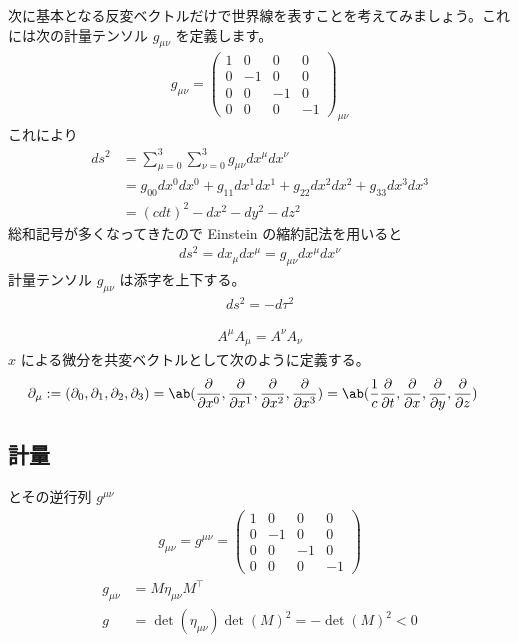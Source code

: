 \documentclass[uplatex,dvipdfmx,a4paper,11pt]{jlreq}
\theoremstyle{definition}
\begin{document}
次に基本となる反変ベクトルだけで世界線を表すことを考えてみましょう。これには次の計量テンソル $g_{\mu\nu}$ を定義します。
\begin{align}
  g_{\mu\nu} = \begin{pmatrix}
                 1 & 0  & 0  & 0  \\
                 0 & -1 & 0  & 0  \\
                 0 & 0  & -1 & 0  \\
                 0 & 0  & 0  & -1
               \end{pmatrix}_{\mu\nu}
\end{align}
これにより
\begin{align}
  ds^2 & = \sum_{\mu = 0}^3\sum_{\nu = 0}^3 g_{\mu\nu}dx^\mu dx^\nu          \\
       & = g_{00}dx^0dx^0 + g_{11}dx^1dx^1 + g_{22}dx^2dx^2 + g_{33}dx^3dx^3 \\
       & = (cdt)^2 - dx^2 - dy^2 - dz^2
\end{align}
総和記号が多くなってきたので Einstein の縮約記法を用いると
\begin{align}
  ds^2 = dx_\mu dx^\mu = g_{\mu\nu}dx^\mu dx^\nu
\end{align}
計量テンソル $g_{\mu\nu}$ は添字を上下する。
\begin{align}
  ds^2 = - d\tau^2
\end{align}

\begin{align}
  A^\mu A_\mu = A^\nu A_\nu
\end{align}
$x$ による微分を共変ベクトルとして次のように定義する。
\begin{align}
  \partial_\mu & := (\partial_0, \partial_1, \partial_2, \partial_3) = \ab(\diffp{}{x^0}, \diffp{}{x^1}, \diffp{}{x^2}, \diffp{}{x^3}) = \ab(\frac{1}{c}\diffp{}{t}, \diffp{}{x}, \diffp{}{y}, \diffp{}{z})
\end{align}

\subsection{計量}
とその逆行列 $g^{\mu\nu}$
\begin{align}
  g_{\mu\nu} = g^{\mu\nu} = \begin{pmatrix}
                              1 & 0 & 0 & 0 \\ 0 & -1 & 0 & 0 \\ 0 & 0 & -1 & 0 \\ 0 & 0 & 0 & -1
                            \end{pmatrix}
\end{align}
\begin{align}
  g_{\mu\nu} & = M\eta_{\mu\nu}M^\top                          \\
  g          & = \det(\eta_{\mu\nu})\det(M)^2 = -\det(M)^2 < 0
\end{align}
\end{document}
